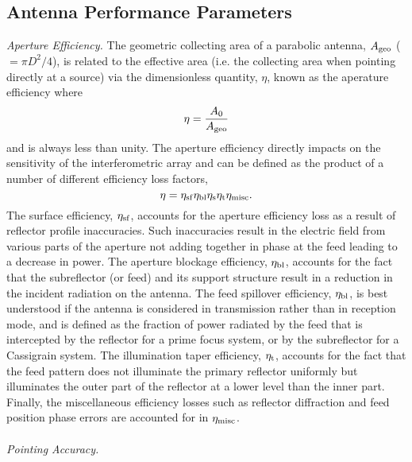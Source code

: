 \subsection{Antenna Performance Parameters}\label{subsec:3}
\textit{Aperture Efficiency.} The geometric collecting area of a parabolic antenna, $A_{\rm{geo}}$ ($=\pi D^2/4$), is related to the effective area (i.e. the collecting area when pointing directly at a source) via the dimensionless quantity, $\eta$, known as the aperature efficiency where
\begin{equation}
\eta = \frac{A_0}{A_{\rm{geo}}} 
\end{equation}
and is always less than unity. The aperture efficiency directly impacts on the sensitivity of the interferometric array and can be defined as the product of a number of different efficiency loss factors, 
\begin{equation}
\eta = \eta _{\rm{sf}}\eta _{\rm{bl}}\eta _{\rm{s}}\eta _{\rm{t}}\eta _{\rm{misc}}.
\end{equation}
The surface efficiency, $\eta _{\rm{sf}}$, accounts for the aperture efficiency loss as a result of reflector profile inaccuracies. Such inaccuracies result in the electric field from various parts of the aperture not adding together in phase at the feed leading to a decrease in power. The aperture blockage efficiency, $\eta _{\rm{bl}}$, accounts for the fact that the subreflector (or feed) and its support structure result in a reduction in the incident radiation on the antenna. The feed spillover efficiency, $\eta _{\rm{bl}}$, is best understood if the antenna is considered in transmission rather than in reception mode, and  is defined as the fraction of power radiated by the feed that is intercepted by the reflector for a prime focus system, or by the subreflector for a Cassigrain system. The illumination taper efficiency, $\eta _{\rm{t}}$, accounts for the fact that the feed pattern does not illuminate the primary reflector uniformly but illuminates the outer part of the reflector at a lower level than the inner part. Finally, the miscellaneous efficiency losses such as reflector diffraction and feed position phase errors are accounted for in $\eta _{\rm{misc}}$.
\\
\\
\textit{Pointing Accuracy.}
